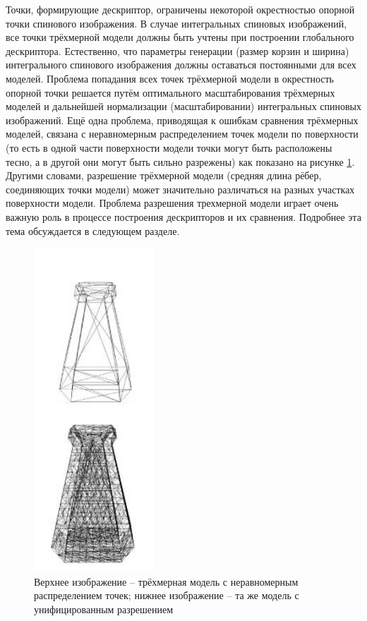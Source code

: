 \documentclass[14pt]{article}
\numberwithin{figure}{section}
\numberwithin{equation}{section}
\begin{document}
Точки, формирующие дескриптор, ограничены некоторой окрестностью опорной точки спинового изображения. В случае интегральных спиновых изображений, все точки трёхмерной модели должны быть учтены при построении глобального дескриптора. Естественно, что параметры генерации (размер корзин и ширина) интегрального спинового изображения должны оставаться постоянными для всех моделей.
Проблема попадания всех точек трёхмерной модели в окрестность опорной точки решается путём оптимального масштабирования трёхмерных моделей и дальнейшей нормализации (масштабировании) интегральных спиновых изображений. Ещё одна проблема, приводящая к ошибкам сравнения трёхмерных моделей, связана с неравномерным распределением точек модели по поверхности (то есть в одной части поверхности модели точки могут быть расположены тесно, а в другой они могут быть сильно разрежены) как показано на рисунке \ref{ris:4}. Другими словами, разрешение трёхмерной модели (средняя длина рёбер, соединяющих точки модели) может значительно различаться на разных участках поверхности модели. Проблема разрешения трехмерной модели играет очень важную роль в процессе построения дескрипторов и их сравнения. Подробнее эта тема обсуждается в следующем разделе.

\begin{figure}[h]
	\begin{center}
		\includegraphics[scale=0.9]{4.JPG}
		\caption{Верхнее изображение – трёхмерная модель с неравномерным распределением точек; нижнее изображение – та же модель с унифицированным разрешением}
		\label{ris:4}
	\end{center}
\end{figure}
\end{document}
